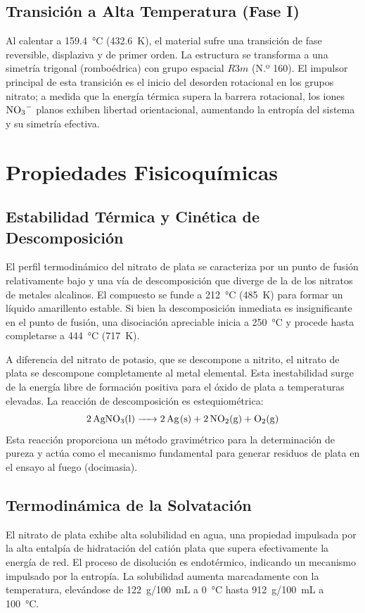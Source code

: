 \documentclass[pdflatex,sn-mathphys-num]{sn-jnl}
\theoremstyle{thmstyleone}%
\theoremstyle{thmstyletwo}%
\theoremstyle{thmstylethree}%
\begin{document}
\subsection{Transición a Alta Temperatura (Fase I)}
Al calentar a \qty{159.4}{\degreeCelsius} (\qty{432.6}{\kelvin}), el material
sufre una transición de fase reversible, displaziva y de primer orden. La
estructura se transforma a una simetría trigonal (romboédrica) con grupo
espacial $R3m$ (N.º 160). El impulsor principal de esta transición es el inicio
del desorden rotacional en los grupos nitrato; a medida que la energía térmica
supera la barrera rotacional, los iones $\ce{NO3-}$ planos exhiben libertad
orientacional, aumentando la entropía del sistema y su simetría efectiva.

\section{Propiedades Fisicoquímicas}
\label{sec:properties}

\subsection{Estabilidad Térmica y Cinética de Descomposición}
El perfil termodinámico del nitrato de plata se caracteriza por un punto de
fusión relativamente bajo y una vía de descomposición que diverge de la de los
nitratos de metales alcalinos. El compuesto se funde a \qty{212}{\degreeCelsius}
(\qty{485}{\kelvin}) para formar un líquido amarillento estable. Si bien la
descomposición inmediata es insignificante en el punto de fusión, una
disociación apreciable inicia a \qty{250}{\degreeCelsius} y procede hasta
completarse a \qty{444}{\degreeCelsius} (\qty{717}{\kelvin}).

A diferencia del nitrato de potasio, que se descompone a nitrito, el nitrato de
plata se descompone completamente al metal elemental. Esta inestabilidad surge
de la energía libre de formación positiva para el óxido de plata a temperaturas
elevadas. La reacción de descomposición es estequiométrica:
\begin{equation}
  \ce{2AgNO3(l) -> 2Ag(s) + 2NO2(g) + O2(g)}
\end{equation}
Esta reacción proporciona un método gravimétrico para la determinación de pureza
y actúa como el mecanismo fundamental para generar residuos de plata en el
ensayo al fuego (docimasia).

\subsection{Termodinámica de la Solvatación}
El nitrato de plata exhibe alta solubilidad en agua, una propiedad impulsada por
la alta entalpía de hidratación del catión plata que supera efectivamente la
energía de red. El proceso de disolución es endotérmico, indicando un mecanismo
impulsado por la entropía. La solubilidad aumenta marcadamente con la
temperatura, elevándose de \qty{122}{\gram}/\qty{100}{\milli\liter} a
\qty{0}{\degreeCelsius} hasta \qty{912}{\gram}/\qty{100}{\milli\liter} a
\qty{100}{\degreeCelsius}.
\end{document}
